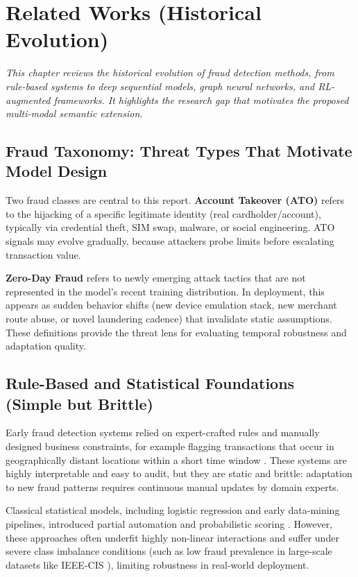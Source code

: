 \documentclass[12pt,a4paper]{report}
\newcommand{\chapterdesc}[1]{%
    \vspace{-0.6\baselineskip}
    \noindent\hspace*{1.5cm}\parbox{\dimexpr\textwidth-1.5cm\relax}{\textit{#1}}
    \par\vspace{0.3\baselineskip}
}
\begin{document}
\chapter{Related Works (Historical Evolution)}
\chapterdesc{This chapter reviews the historical evolution of fraud detection methods, from rule-based systems to deep sequential models, graph neural networks, and RL-augmented frameworks. It highlights the research gap that motivates the proposed multi-modal semantic extension.}

\section{Fraud Taxonomy: Threat Types That Motivate Model Design}
\label{sec:fraud-taxonomy}
Two fraud classes are central to this report. \textbf{Account Takeover (ATO)} refers to the hijacking of a specific legitimate identity (real cardholder/account), typically via credential theft, SIM swap, malware, or social engineering. ATO signals may evolve gradually, because attackers probe limits before escalating transaction value.

\textbf{Zero-Day Fraud} refers to newly emerging attack tactics that are not represented in the model's recent training distribution. In deployment, this appears as sudden behavior shifts (new device emulation stack, new merchant route abuse, or novel laundering cadence) that invalidate static assumptions. These definitions provide the threat lens for evaluating temporal robustness and adaptation quality.

\section{Rule-Based and Statistical Foundations (Simple but Brittle)}
Early fraud detection systems relied on expert-crafted rules and manually designed business constraints, for example flagging transactions that occur in geographically distant locations within a short time window \cite{rule_based_fraud}. These systems are highly interpretable and easy to audit, but they are static and brittle: adaptation to new fraud patterns requires continuous manual updates by domain experts.

Classical statistical models, including logistic regression and early data-mining pipelines, introduced partial automation and probabilistic scoring \cite{logistic_fraud,datamining_fraud}. However, these approaches often underfit highly non-linear interactions and suffer under severe class imbalance conditions (such as low fraud prevalence in large-scale datasets like IEEE-CIS \cite{ieee_cis_dataset}), limiting robustness in real-world deployment.
\end{document}
